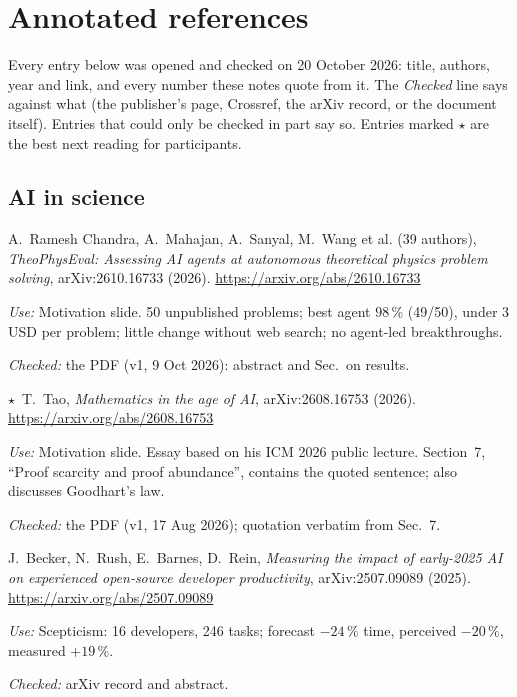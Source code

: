 \section{Annotated references}\label{sec:references}
\raggedright

Every entry below was opened and checked on 20 October 2026: title, authors, year and
link, and every number these notes quote from it. The \emph{Checked} line says against
what (the publisher's page, Crossref, the arXiv record, or the document itself). Entries
that could only be checked in part say so. Entries marked $\star$ are the best next
reading for participants.

\newcommand{\refentry}[2]{\item\label{ref:#1}#2}
\newcommand{\use}[1]{\par\textit{Use:} #1}
\newcommand{\checked}[1]{\par{\small\textit{Checked:} #1}}
\newcommand{\best}{$\star$\ }

\subsection*{AI in science}
\begin{enumerate}[label={[\arabic*]}, ref=\arabic*, series=refs, leftmargin=*, itemsep=6pt]
\refentry{theophyseval}{A.~Ramesh Chandra, A.~Mahajan, A.~Sanyal, M.~Wang et al.
  (39 authors), \emph{TheoPhysEval: Assessing AI agents at autonomous theoretical physics
  problem solving}, arXiv:2610.16733 (2026).
  \url{https://arxiv.org/abs/2610.16733}
  \use{Motivation slide. 50 unpublished problems; best agent $98\,\%$ (49/50), under
  3\,USD per problem; little change without web search; no agent-led breakthroughs.}
  \checked{the PDF (v1, 9 Oct 2026): abstract and Sec.~on results.}}
\refentry{tao}{\best T.~Tao, \emph{Mathematics in the age of AI}, arXiv:2608.16753
  (2026). \url{https://arxiv.org/abs/2608.16753}
  \use{Motivation slide. Essay based on his ICM 2026 public lecture. Section~7, ``Proof
  scarcity and proof abundance'', contains the quoted sentence; also discusses
  Goodhart's law.}
  \checked{the PDF (v1, 17 Aug 2026); quotation verbatim from Sec.~7.}}
\refentry{metr}{J.~Becker, N.~Rush, E.~Barnes, D.~Rein, \emph{Measuring the impact of
  early-2025 AI on experienced open-source developer productivity}, arXiv:2507.09089
  (2025). \url{https://arxiv.org/abs/2507.09089}
  \use{Scepticism: 16 developers, 246 tasks; forecast $-24\,\%$ time, perceived
  $-20\,\%$, measured $+19\,\%$.}
  \checked{arXiv record and abstract.}}
\end{enumerate}

